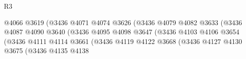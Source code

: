 \begin{lexlean}{R3}
\begin{coremodule}
                                                        @4066
                                                        @3619
                                                        (@3436
                                                          @4071
                                                          @4074
                                                          @3626
                                                          (@3436
                                                            @4079
                                                            @4082
                                                            @3633
                                                            (@3436
                                                              @4087
                                                              @4090
                                                              @3640
                                                              (@3436
                                                                @4095
                                                                @4098
                                                                @3647
                                                                (@3436
                                                                  @4103
                                                                  @4106
                                                                  @3654
                                                                  (@3436
                                                                    @4111
                                                                    @4114
                                                                    @3661
                                                                    (@3436
                                                                      @4119
                                                                      @4122
                                                                      @3668
                                                                      (@3436
                                                                        @4127
                                                                        @4130
                                                                        @3675
                                                                        (@3436
                                                                          @4135
                                                                          @4138

\end{coremodule}
\end{lexlean}
